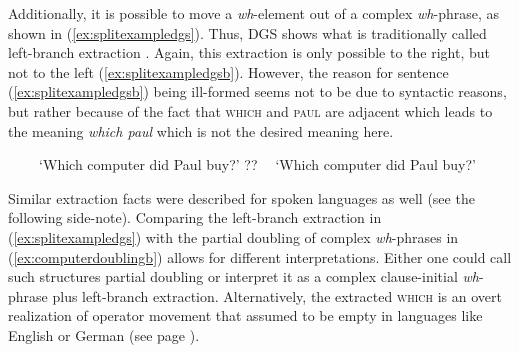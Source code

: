 \noindent Additionally, it is possible to move a \textit{wh}-element out of a complex \textit{wh}-phrase, as shown in (\ref{ex:splitexampledgs}). Thus, DGS shows what is traditionally called left-branch extraction \citep{bovskovic2005left, bovskovic2005locality}. Again, this extraction is only possible to the right, but not to the left (\ref{ex:splitexampledgsb}). However, the reason for sentence (\ref{ex:splitexampledgsb}) being ill-formed seems not to be due to syntactic reasons, but rather because of the fact that \textsc{which} and \textsc{paul} are adjacent which leads to the meaning \textit{which paul} which is not the desired meaning here.%


\begin{exe}
\ex\label{blablablahunderttausend}\begin{xlist}
\ex \textcolor{white}{??}
%
\glt \textcolor{white}{??}`Which computer did Paul buy?' \label{ex:splitexampledgs}
\ex ??
%
\glt \textcolor{white}{??}`Which computer did Paul buy?' \label{ex:splitexampledgsb}
\end{xlist}
\end{exe} 

\newpage 
\noindent Similar extraction facts were described for spoken languages as well (see the following side-note). Comparing the left-branch extraction in (\ref{ex:splitexampledgs}) with the partial doubling of complex \textit{wh}-phrases in (\ref{ex:computerdoublingb}) allows for different interpretations. Either one could call such structures partial doubling or interpret it as a complex clause-initial \textit{wh}-phrase plus left-branch extraction. Alternatively, the extracted \textsc{which} is an overt realization of operator movement that \citet{van2010complex} assumed to be empty in languages like English or German (see page \pageref{emptyoperator}). 

